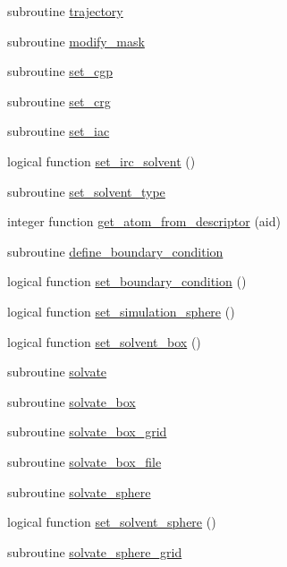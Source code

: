 \begin{DoxyCompactItemize}
subroutine \hyperlink{classprep_aa25e33c6f5da38aba332f11ca5cff8f3}{trajectory}
\item 
subroutine \hyperlink{classprep_a977d8921a8e453a4a83f89e42147e5e9}{modify\-\_\-mask}
\item 
subroutine \hyperlink{classprep_a92afff65bcc25e77c24396983122b519}{set\-\_\-cgp}
\item 
subroutine \hyperlink{classprep_aa73f65ac2841ae32010701ac95af166a}{set\-\_\-crg}
\item 
subroutine \hyperlink{classprep_ac058180472b1eead5ada468b0ddb2a3b}{set\-\_\-iac}
\item 
logical function \hyperlink{classprep_a6b313325f97052430b9b558dca9606fd}{set\-\_\-irc\-\_\-solvent} ()
\item 
subroutine \hyperlink{classprep_aa37b27ef2e62436323ff35a371c0d152}{set\-\_\-solvent\-\_\-type}
\item 
integer function \hyperlink{classprep_aa1417fc48a24a3fd294d10f9254a0a0c}{get\-\_\-atom\-\_\-from\-\_\-descriptor} (aid)
\item 
subroutine \hyperlink{classprep_a63b4a8d3ff88f78114eb1d70ba5fbef1}{define\-\_\-boundary\-\_\-condition}
\item 
logical function \hyperlink{classprep_a6cb87d50fe4a6bf0ae27fe34d7316f5b}{set\-\_\-boundary\-\_\-condition} ()
\item 
logical function \hyperlink{classprep_a35f72f5ffad726d4d9f3f8405837b1a2}{set\-\_\-simulation\-\_\-sphere} ()
\item 
logical function \hyperlink{classprep_a28767f39911fb26ba4be630e1b41c4e5}{set\-\_\-solvent\-\_\-box} ()
\item 
subroutine \hyperlink{classprep_ab40618e65f3f9ff77388540cc08fb857}{solvate}
\item 
subroutine \hyperlink{classprep_adea6f92652c57e735fc1ecfb1c51b307}{solvate\-\_\-box}
\item 
subroutine \hyperlink{classprep_a69ec3a8bd439427b2a57259dcf0b7db5}{solvate\-\_\-box\-\_\-grid}
\item 
subroutine \hyperlink{classprep_acd0632e7396c17a73263117350d795b2}{solvate\-\_\-box\-\_\-file}
\item 
subroutine \hyperlink{classprep_a94b652674f1c868ef55bb9e4a3cd8204}{solvate\-\_\-sphere}
\item 
logical function \hyperlink{classprep_abb116903e6c029e9d8ad398fc9968393}{set\-\_\-solvent\-\_\-sphere} ()
\item 
subroutine \hyperlink{classprep_a48c69af56814950cb78d8a40679c6389}{solvate\-\_\-sphere\-\_\-grid}

\end{DoxyCompactItemize}
